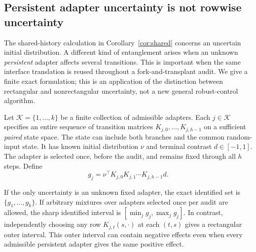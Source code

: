 \subsection{Persistent adapter uncertainty is not rowwise uncertainty}\label{app:persistent}
The shared-history calculation in Corollary~\ref{cor:shared} concerns an uncertain initial distribution. A different kind of entanglement arises when an unknown \emph{persistent} adapter affects several transitions. This is important when the same interface translation is reused throughout a fork-and-transplant audit. We give a finite exact formulation; this is an application of the distinction between rectangular and nonrectangular uncertainty, not a new general robust-control algorithm.

Let $\mathcal K=\{1,\ldots,k\}$ be a finite collection of admissible adapters. Each $j\in\mathcal K$ specifies an entire sequence of transition matrices $K_{j,0},\ldots,K_{j,h-1}$ on a sufficient \emph{paired} state space. The state can include both branches and the common random-input state. It has known initial distribution $\nu$ and terminal contrast $d\in[-1,1]$. The adapter is selected once, before the audit, and remains fixed through all $h$ steps. Define
\[
 g_j=\nu^\top K_{j,0}K_{j,1}\cdots K_{j,h-1}d.
\]
\begin{proposition}\label{prop:persistent}
If the only uncertainty is an unknown fixed adapter, the exact identified set is $\{g_1,\ldots,g_k\}$. If arbitrary mixtures over adapters selected once per audit are allowed, the sharp identified interval is $[\min_j g_j,\max_j g_j]$. In contrast, independently choosing any row $K_{j,t}(s,\cdot)$ at each $(t,s)$ gives a rectangular outer interval. This outer interval can contain negative effects even when every admissible persistent adapter gives the same positive effect.
\end{proposition}
